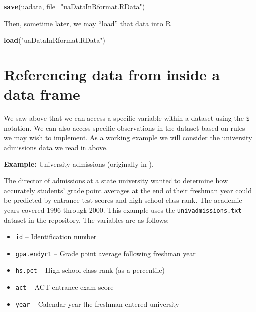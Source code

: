 \documentclass[
]{book}
\newenvironment{Shaded}{\begin{snugshade}}{\end{snugshade}}
\newcommand{\AttributeTok}[1]{\textcolor[rgb]{0.13,0.29,0.53}{#1}}
\newcommand{\FunctionTok}[1]{\textcolor[rgb]{0.13,0.29,0.53}{\textbf{#1}}}
\newcommand{\NormalTok}[1]{#1}
\newcommand{\StringTok}[1]{\textcolor[rgb]{0.31,0.60,0.02}{#1}}
\providecommand{\tightlist}{%
  \setlength{\itemsep}{0pt}\setlength{\parskip}{0pt}}
\begin{document}
\begin{Shaded}
\begin{Highlighting}[]
\FunctionTok{save}\NormalTok{(uadata, }\AttributeTok{file=}\StringTok{"uaDataInRformat.RData"}\NormalTok{)}
\end{Highlighting}
\end{Shaded}

Then, sometime later, we may ``load'' that data into R

\begin{Shaded}
\begin{Highlighting}[]
\FunctionTok{load}\NormalTok{(}\StringTok{"uaDataInRformat.RData"}\NormalTok{)}
\end{Highlighting}
\end{Shaded}

\hypertarget{referencing-data-from-inside-a-data-frame}{%
\section{Referencing data from inside a data frame}\label{referencing-data-from-inside-a-data-frame}}

We saw above that we can access a specific variable within a dataset using the \texttt{\$} notation. We can also access specific observations in the dataset based on rules we may wish to implement. As a working example we will consider the university admissions data we read in above.

\textbf{Example:} University admissions (originally in \citet{KutnerText}).

The director of admissions at a state university wanted to determine how accurately students' grade point averages at the end of their freshman year could be predicted by entrance test scores and high school class rank. The academic years covered 1996 through 2000. This example uses the \texttt{univadmissions.txt} dataset in the repository. The variables are as follows:

\begin{itemize}
\tightlist
\item
  \texttt{id} -- Identification number
\item
  \texttt{gpa.endyr1} -- Grade point average following freshman year
\item
  \texttt{hs.pct} -- High school class rank (as a percentile)
\item
  \texttt{act} -- ACT entrance exam score
\item
  \texttt{year} -- Calendar year the freshman entered university
\end{itemize}
\end{document}
